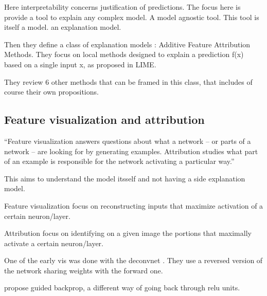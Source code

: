 \documentclass{article}
\begin{document}
Here interpretability concerns justification of predictions.
The focus here is provide a tool to explain any complex model. A model agnostic tool.
This tool is itself a model. an explanation model.

Then they define a class of explanation models : Additive Feature Attribution Methods. They focus on local methods designed to explain a prediction f(x) based on a single input x, as proposed in LIME\citep{Ribeiro2016Why}.

They review 6 other methods that can be framed in this class, that includes of course their own propositions.

\subsection{Feature visualization and attribution}
``Feature visualization answers questions about what a network -- or parts of a network -- are looking for by generating examples.
Attribution  studies what part of an example is responsible for the network activating a particular way.'' \citep{Olah2017Feature}

This aims to understand the model itsself and not having a side explanation model.

Feature visualization focus on reconstructing inputs that maximize activation of a certain neuron/layer.

Attribution focus on identifying on a given image the portions that maximally activate a certain neuron/layer.

One of the early vis was done with the deconvnet \citep[same paper of the clarifai net]{Zeiler2014Visualizing}. They use a reversed version of the network sharing weights with the forward one.

\citet[paper proposing to use only convs and no pooling]{Springenberg2014Striving} propose guided backprop, a different way of going back through relu units.




\end{document}
